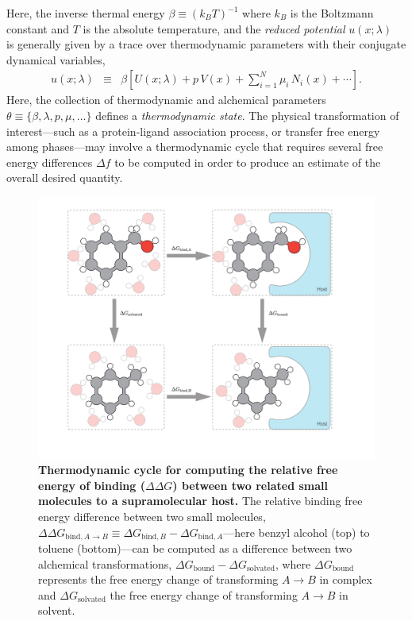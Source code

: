 \documentclass[9pt,bestpractices]{livecoms}
\begin{document}
Here, the inverse thermal energy $\beta \equiv (k_B T)^{-1}$ where $k_B$ is the Boltzmann constant and $T$ is the absolute temperature, and the \emph{reduced potential} $u(x; \lambda)$~\cite{shirts2008statistically} is generally given by a trace over thermodynamic parameters with their conjugate dynamical variables,
\begin{eqnarray}
u(x;\lambda) &\equiv& \beta \left[ U(x;\lambda) + p \, V(x) + \sum_{i=1}^N \mu_i \, N_i(x) + \cdots \right] . \label{equation:reduced-potential}
\end{eqnarray}
Here, the collection of thermodynamic and alchemical parameters $\theta \equiv \{\beta, \lambda, p, \mu, \ldots\}$ defines a \emph{thermodynamic state}.
The physical transformation of interest---such as a protein-ligand association process, or transfer free energy among phases---may involve a thermodynamic cycle that requires several free energy differences $\Delta f$ to be computed in order to produce an estimate of the overall desired quantity.

\begin{figure}
    \includegraphics[width=0.95\linewidth]{paper/figures/fig3_therm_cyc/Fig3.pdf}
    \caption{{\bf Thermodynamic cycle for computing the relative free energy of binding ($\Delta \Delta G$) between two related small molecules to a supramolecular host.}
    The relative binding free energy difference between two small molecules, $\Delta \Delta G_{\mathrm{bind}, A \rightarrow B} \equiv \Delta G_{\mathrm{bind}, B} - \Delta G_{\mathrm{bind}, A}$---here benzyl alcohol (top) to toluene (bottom)---can be computed as a difference between two alchemical transformations, $\Delta G_\mathrm{bound} - \Delta G_\mathrm{solvated}$, where $\Delta G_\mathrm{bound}$ represents the free energy change of transforming $A \rightarrow B$ in complex and $\Delta G_\mathrm{solvated}$ the free energy change of transforming $A \rightarrow B$ in solvent.}
    \label{fig:fig3_binding-thermodynamic-cycle}
\end{figure}
\end{document}
